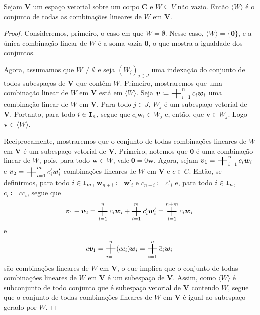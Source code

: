 \begin{teo}
	Sejam $\bm V$ um espaço vetorial sobre um corpo $\bm C$ e $W \subseteq V$ não vazio. Então $\langle W \rangle$ é o conjunto de todas as combinações lineares de $W$ em $\bm V$.
\end{teo}
\begin{proof}
	Consideremos, primeiro, o caso em que $W=\emptyset$. Nesse caso, $\langle W \rangle = \{\bm 0\}$, e a única combinação linear de $W$ é a soma vazia $\bm 0$, o que mostra a igualdade dos conjuntos.

	Agora, assumamos que $W \neq \emptyset$ e seja $(W_j)_{j \in J}$ uma indexação do conjunto de todos subespaços de $\bm V$ que contêm $W$. Primeiro, mostraremos que uma combinação linear de $W$ em $\bm V$ está em $\langle W \rangle$. Seja $\bm v \coloneqq \bigsum_{i=1}^n c_i\bm w_i$ uma combinação linear de $W$ em $\bm V$. Para todo $j \in J$, $W_j$ é um subespaço vetorial de $\bm V$. Portanto, para todo $i \in \mathtt I_n$, segue que $c_i \bm{w_i} \in W_j$ e, então, que $\bm v \in W_j$. Logo $\bm v \in \langle W \rangle$.

	Reciprocamente, mostraremos que o conjunto de todas combinações lineares de $W$ em $\bm V$ é um subespaço vetorial de $\bm V$. Primeiro, notemos que $\bm 0$ é uma combinação linear de $W$, pois, para todo $\bm w \in W$, vale $\bm 0 = 0\bm w$. Agora, sejam $\bm v_1 = \bigsum_{i=1}^n c_i\bm w_i$ e $\bm v_2 = \bigsum_{i=1}^m c'_i\bm w'_i$ combinações lineares de $W$ em $\bm V$ e $c \in C$. Então, se definirmos, para todo $i \in \mathtt I_m$, $\bm w_{n+i} \coloneqq \bm w'_i$ e $c_{n+i} \coloneqq c'_i$ e, para todo $i \in \mathtt I_n$, $\overline c_i \coloneqq cc_i$, segue que
	\begin{equation*}
	\bm v_1 + \bm v_2 = \bigsum_{i=1}^n c_i\bm w_i + \bigsum_{i=1}^m c'_i\bm w'_i = \bigsum_{i=1}^{n+m} c_i\bm w_i
	\end{equation*}
e
	\begin{equation*}
	c\bm v_1 = \bigsum_{i=1}^n (cc_i)\bm w_i = \bigsum_{i=1}^n \overline c_i \bm w_i
	\end{equation*}
são combinações lineares de $W$ em $\bm V$, o que implica que o conjunto de todas combinações lineares de $W$ em $\bm V$ é um subespaço de $\bm V$. Assim, como $\langle W \rangle$ é subconjunto de todo conjunto que é subespaço vetorial de $\bm V$ contendo $W$, segue que o conjunto de todas combinações lineares de $W$ em $\bm V$ é igual ao subespaço gerado por $W$.
\end{proof}

